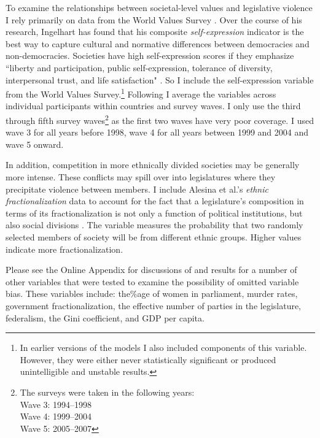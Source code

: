 \documentclass[a4paper]{article}\usepackage[]{graphicx}\usepackage[]{color}
\begin{document}
To examine the relationships between societal-level values and legislative violence I rely primarily on data from the World Values Survey \citeyearpar{WVS2009}. Over the course of his research, Ingelhart has found that his composite {\emph{self-expression}} indicator is the best way to capture cultural and normative differences between democracies and non-democracies. Societies have high self-expression scores if they emphasize ``liberty and participation, public self-expression, tolerance of diversity, interpersonal trust, and life satisfaction" \citep[64]{Inglehart2003}. So I include the self-expression variable from the World Values Survey.\footnote{In earlier versions of the models I also included components of this variable. However, they were either never statistically significant or produced unintelligible and unstable results.} Following \cite{Inglehart2003} I average the variables across individual participants within countries and survey waves. I only use the third through fifth survey waves\footnote{The surveys were taken in the following years: \\ Wave 3: 1994--1998 \\ Wave 4: 1999--2004 \\ Wave 5: 2005--2007} as the first two waves have very poor coverage. I used wave 3 for all years before 1998, wave 4 for all years between 1999 and 2004 and wave 5 onward.

In addition, competition in more ethnically divided societies may be generally more intense. These conflicts may spill over into legislatures where they precipitate violence between members. I include Alesina et al.'s \citeyearpar{Alesina2003} {\emph{ethnic fractionalization}} data to account for the fact that a legislature's composition in terms of its fractionalization is not only a function of political institutions, but also social divisions \citep{Neto1997, Mozaffar2003}. The variable measures the probability that two randomly selected members of society will be from different ethnic groups. Higher values indicate more fractionalization.

Please see the Online Appendix for discussions of and results for a number of other variables that were tested to examine the possibility of omitted variable bias. These variables include: the\%age of women in parliament, murder rates, government fractionalization, the effective number of parties in the legislature, federalism, the Gini coefficient, and GDP per capita.

\end{document}
